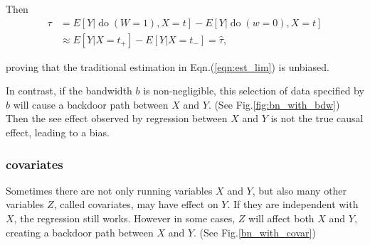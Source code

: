 \documentclass[a4 paper,12pt]{article}
\DeclareMathOperator{\Do}{do}
\begin{document}
Then
\begin{align}
   \tau&=E[Y|\Do(W=1),X=t]-E[Y|\Do(w=0),X=t]\\
   &\approx E[Y|X=t_+]-E[Y|X=t_-]=\hat\tau,
\end{align}

\noindent proving that the traditional estimation in Eqn.(\ref{eqn:est_lim}) is unbiased.

In contrast, if the bandwidth $b$ is non-negligible, this selection of data specified by $b$ will cause a backdoor path between $X$ and $Y$. (See Fig.\ref{fig:bn_with_bdw}) Then the see effect observed by regression between $X$ and $Y$ is not the true causal effect, leading to a bias.

\subsubsection*{covariates}
Sometimes there are not only running variables $X$ and $Y$, but also many other variables $Z$, called covariates, may have effect on $Y$. If they are independent with $X$, the regression still works. However in some cases, $Z$ will affect both $X$ and $Y$, creating a backdoor path between $X$ and $Y$. (See Fig.\ref{bn_with_covar})
\end{document}
